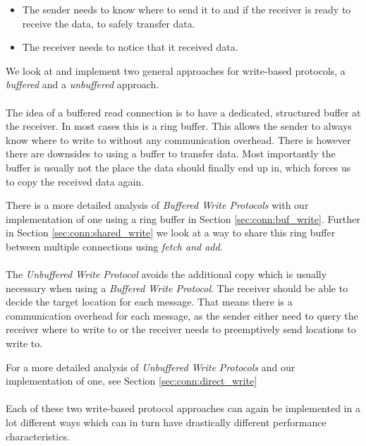 \begin{itemize}
  \item The sender needs to know where to send it to and if the receiver is ready to receive the data, to safely transfer data.

  \item The receiver needs to notice that it received data.
\end{itemize}

We look at and implement two general approaches for write-based protocols, a \emph{buffered} and a \emph{unbuffered} approach.

\paragraph{} The idea of a buffered read connection is to have a dedicated, structured buffer at the receiver. In most cases 
this is a ring buffer. This allows the sender to always know where to write to without any communication overhead. There is
however there are downsides to using a buffer to transfer data. Most importantly the buffer is usually not the place the 
data should finally end up in, which forces us to copy the received data again.

There is a more detailed analysis of \emph{Buffered Write Protocols} with our implementation of one using a ring buffer in 
Section \ref{sec:conn:buf_write}. Further in Section \ref{sec:conn:shared_write} we look at a way to share this ring
buffer between multiple connections using \emph{fetch and add}.


\paragraph{} The  \emph{Unbuffered Write Protocol} avoids the additional copy which is usually necessary when 
using a \emph{Buffered Write Protocol}. The receiver should be able to decide the target location for each message. 
That means there is a communication overhead for each message, as the sender either need to query the receiver where to 
write to or the receiver needs to preemptively send locations to write to.

For a more detailed analysis of \emph{Unbuffered Write Protocols} and our implementation of one, 
see Section \ref{sec:conn:direct_write}


\paragraph{}Each of these two write-based protocol approaches can again be implemented in a lot different ways which can
in turn have drastically different performance characteristics. 


